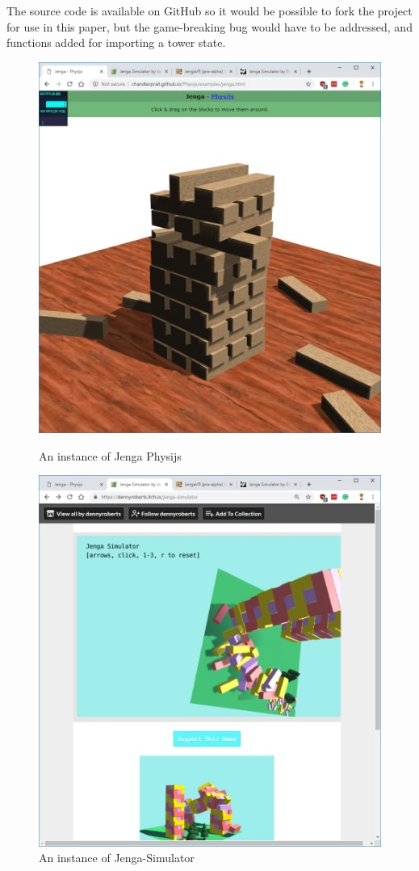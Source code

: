 The source code is available on GitHub so it would be possible to fork the project for use in this paper, but the game-breaking bug would have to be addressed, and functions added for importing a tower state.

\begin{figure}[ht]
\begin{minipage}{0.45\textwidth}
    \centering
    \includegraphics[width=.8\linewidth]{images/litreview/jenga-2}
    \caption{An instance of Jenga Physijs \protect\citep{github-Physijs}}
    \label{fig:simulator1}
\end{minipage}\hfill
\begin{minipage}{0.45\textwidth}
    \centering
    \includegraphics[width=.8\linewidth]{images/litreview/jenga-1}
    \caption{An instance of Jenga-Simulator \protect\citep{itchjenagasimdennisroberts}}
    \label{fig:simulator2}
\end{minipage}
\end{figure}

